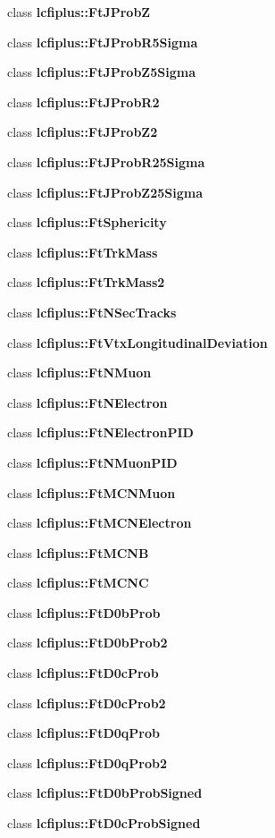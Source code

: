 \begin{DoxyCompactItemize}
class \textbf{ lcfiplus\+::\+Ft\+J\+ProbZ}
\item 
class \textbf{ lcfiplus\+::\+Ft\+J\+Prob\+R5\+Sigma}
\item 
class \textbf{ lcfiplus\+::\+Ft\+J\+Prob\+Z5\+Sigma}
\item 
class \textbf{ lcfiplus\+::\+Ft\+J\+Prob\+R2}
\item 
class \textbf{ lcfiplus\+::\+Ft\+J\+Prob\+Z2}
\item 
class \textbf{ lcfiplus\+::\+Ft\+J\+Prob\+R25\+Sigma}
\item 
class \textbf{ lcfiplus\+::\+Ft\+J\+Prob\+Z25\+Sigma}
\item 
class \textbf{ lcfiplus\+::\+Ft\+Sphericity}
\item 
class \textbf{ lcfiplus\+::\+Ft\+Trk\+Mass}
\item 
class \textbf{ lcfiplus\+::\+Ft\+Trk\+Mass2}
\item 
class \textbf{ lcfiplus\+::\+Ft\+N\+Sec\+Tracks}
\item 
class \textbf{ lcfiplus\+::\+Ft\+Vtx\+Longitudinal\+Deviation}
\item 
class \textbf{ lcfiplus\+::\+Ft\+N\+Muon}
\item 
class \textbf{ lcfiplus\+::\+Ft\+N\+Electron}
\item 
class \textbf{ lcfiplus\+::\+Ft\+N\+Electron\+P\+ID}
\item 
class \textbf{ lcfiplus\+::\+Ft\+N\+Muon\+P\+ID}
\item 
class \textbf{ lcfiplus\+::\+Ft\+M\+C\+N\+Muon}
\item 
class \textbf{ lcfiplus\+::\+Ft\+M\+C\+N\+Electron}
\item 
class \textbf{ lcfiplus\+::\+Ft\+M\+C\+NB}
\item 
class \textbf{ lcfiplus\+::\+Ft\+M\+C\+NC}
\item 
class \textbf{ lcfiplus\+::\+Ft\+D0b\+Prob}
\item 
class \textbf{ lcfiplus\+::\+Ft\+D0b\+Prob2}
\item 
class \textbf{ lcfiplus\+::\+Ft\+D0c\+Prob}
\item 
class \textbf{ lcfiplus\+::\+Ft\+D0c\+Prob2}
\item 
class \textbf{ lcfiplus\+::\+Ft\+D0q\+Prob}
\item 
class \textbf{ lcfiplus\+::\+Ft\+D0q\+Prob2}
\item 
class \textbf{ lcfiplus\+::\+Ft\+D0b\+Prob\+Signed}
\item 
class \textbf{ lcfiplus\+::\+Ft\+D0c\+Prob\+Signed}

\end{DoxyCompactItemize}
